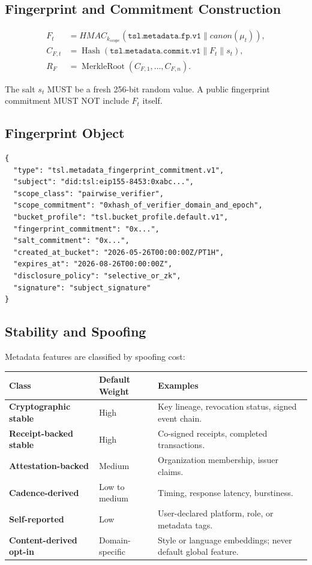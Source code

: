 \documentclass[11pt]{article}
\newcommand{\hash}{\operatorname{Hash}}
\newcommand{\MerkleRoot}{\operatorname{MerkleRoot}}
\begin{document}
\subsection{Fingerprint and Commitment Construction}

\begin{align}
F_t &= HMAC_{k_{scope}}(\texttt{tsl.metadata.fp.v1}\parallel canon(\mu_t)),\\
C_{F,t} &= \hash(\texttt{tsl.metadata.commit.v1}\parallel F_t\parallel s_t),\\
R_F &= \MerkleRoot(C_{F,1},\ldots,C_{F,n}).
\end{align}

The salt \(s_t\) MUST be a fresh 256-bit random value. A public fingerprint commitment MUST NOT include \(F_t\) itself.

\subsection{Fingerprint Object}

\begin{lstlisting}[style=tslcode]
{
  "type": "tsl.metadata_fingerprint_commitment.v1",
  "subject": "did:tsl:eip155-8453:0xabc...",
  "scope_class": "pairwise_verifier",
  "scope_commitment": "0xhash_of_verifier_domain_and_epoch",
  "bucket_profile": "tsl.bucket_profile.default.v1",
  "fingerprint_commitment": "0x...",
  "salt_commitment": "0x...",
  "created_at_bucket": "2026-05-26T00:00:00Z/PT1H",
  "expires_at": "2026-08-26T00:00:00Z",
  "disclosure_policy": "selective_or_zk",
  "signature": "subject_signature"
}
\end{lstlisting}

\subsection{Stability and Spoofing}

Metadata features are classified by spoofing cost:

\begin{center}
\begin{tabularx}{\textwidth}{>{\bfseries}p{} p{} X}
\toprule
Class & Default Weight & Examples \\
\midrule
Cryptographic stable & High & Key lineage, revocation status, signed event chain. \\
Receipt-backed stable & High & Co-signed receipts, completed transactions. \\
Attestation-backed & Medium & Organization membership, issuer claims. \\
Cadence-derived & Low to medium & Timing, response latency, burstiness. \\
Self-reported & Low & User-declared platform, role, or metadata tags. \\
Content-derived opt-in & Domain-specific & Style or language embeddings; never default global feature. \\
\bottomrule
\end{tabularx}
\end{center}
\end{document}
